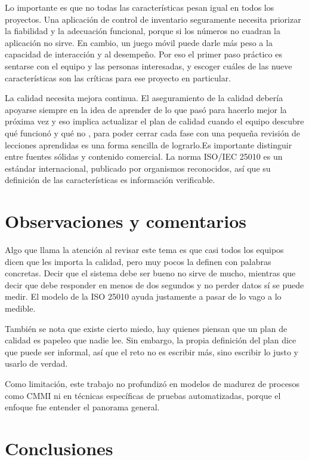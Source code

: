 \documentclass[12pt,letterpaper]{article}
\begin{document}
Lo importante es que no todas las características pesan igual en todos los proyectos. Una aplicación de control de inventario seguramente necesita priorizar la fiabilidad y la adecuación funcional, porque si los números no cuadran la aplicación no sirve. En cambio, un juego móvil puede darle más peso a la capacidad de interacción y al desempeño. Por eso el primer paso práctico es sentarse con el equipo y las personas interesadas, y escoger cuáles de las nueve características son las críticas para ese proyecto en particular.

La calidad necesita mejora continua. El aseguramiento de la calidad debería apoyarse siempre en la idea de aprender de lo que pasó para hacerlo mejor la próxima vez y eso implica actualizar el plan de calidad cuando el equipo descubre qué funcionó y qué no , para poder cerrar cada fase con una pequeña revisión de lecciones aprendidas es una forma sencilla de lograrlo.Es importante distinguir entre fuentes sólidas y contenido comercial. La norma ISO/IEC 25010 es un estándar internacional, publicado por organismos reconocidos, así que su definición de las características es información verificable.

\section*{Observaciones y comentarios}

Algo que llama la atención al revisar este tema es que casi todos los equipos dicen que les importa la calidad, pero muy pocos la definen con palabras concretas. Decir que el sistema debe ser bueno no sirve de mucho, mientras que decir que debe responder en menos de dos segundos y no perder datos sí se puede medir. El modelo de la ISO 25010 ayuda justamente a pasar de lo vago a lo medible.

También se nota que existe cierto miedo, hay quienes piensan que un plan de calidad es papeleo que nadie lee. Sin embargo, la propia definición del plan dice que puede ser informal, así que el reto no es escribir más, sino escribir lo justo y usarlo de verdad.

Como limitación, este trabajo no profundizó en modelos de madurez de procesos como CMMI ni en técnicas específicas de pruebas automatizadas, porque el enfoque fue entender el panorama general.

\section*{Conclusiones}
\end{document}
